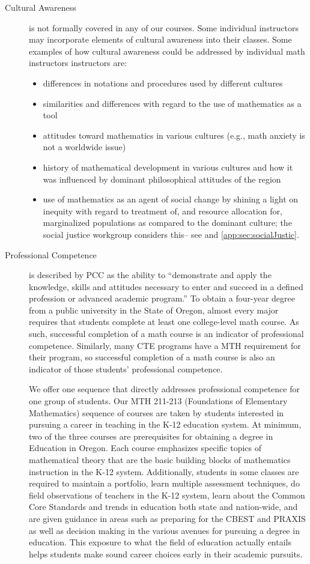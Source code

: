 \begin{description}
\item[Cultural Awareness] is not formally covered in any of our courses.  Some
  individual instructors may incorporate elements of cultural awareness into
  their classes.  Some examples of how cultural awareness could be addressed by
  individual math instructors instructors are: 
\begin{itemize}
\item differences in notations and procedures used by different cultures
\item similarities and differences with regard to the use of mathematics as a
  tool 
\item attitudes toward mathematics in various cultures (e.g., math anxiety is
  not a worldwide issue) 
\item history of mathematical  development in various cultures and how it was
  influenced by dominant philosophical attitudes of the region
\item use of mathematics as an agent of social change by shining a light on
  inequity with regard to treatment of, and resource allocation for,
  marginalized populations as compared to the dominant culture; the social
  justice workgroup considers this-- see  and
  \vref{app:sec:socialJustic}. 
\end{itemize}

\item[Professional Competence] is described by PCC as the ability to
  ``demonstrate and apply the knowledge, skills and attitudes necessary to enter
  and succeed in a defined profession or advanced academic program.'' To obtain
  a four-year degree from a public university in the State of Oregon, almost
  every major requires that students complete at least one college-level math
  course.  As such, successful completion of a math course is an indicator of
  professional competence.  Similarly, many CTE programs have a MTH requirement
  for their program, so successful completion of a math course is also an
  indicator of those students' professional competence. 

We offer one sequence that directly addresses professional competence for one
group of students.  Our  MTH 211-213 (Foundations of Elementary Mathematics)
sequence of courses are taken by students interested in pursuing a career in
teaching in the K-12 education system.  At minimum, two of the three courses are
prerequisites for obtaining a degree in Education in Oregon.  Each course
emphasizes specific topics of mathematical theory that are the basic building
blocks of mathematics instruction in the K-12 system.  Additionally, students in
some classes are required to maintain a portfolio, learn multiple assessment
techniques, do field observations of teachers in the K-12 system, learn about
the Common Core Standards and trends in education both state and nation-wide,
and are given guidance in areas such as preparing for the CBEST and PRAXIS as
well as decision making in the various avenues for pursuing a degree in
education.  This exposure to what the field of education actually entails  helps
students make sound career choices early in their academic pursuits.


\end{description}
